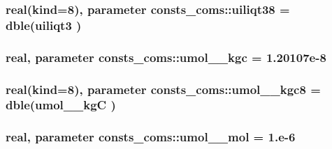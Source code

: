 \subsubsection[{\texorpdfstring{uiliqt38}{uiliqt38}}]{\setlength{\rightskip}{0pt plus 5cm}real(kind=8), parameter consts\+\_\+coms\+::uiliqt38 = dble({\bf uiliqt3} )}\hypertarget{namespaceconsts__coms_a171bd610659557729762f52743c3af83}{}\label{namespaceconsts__coms_a171bd610659557729762f52743c3af83}
\subsubsection[{\texorpdfstring{umol\+\_\+2\+\_\+kgc}{umol_2_kgc}}]{\setlength{\rightskip}{0pt plus 5cm}real, parameter consts\+\_\+coms\+::umol\+\_\+\_\+kgc = 1.\+20107e-\/8}\hypertarget{namespaceconsts__coms_a756eff7bd58f33114bdbf059ce2c6726}{}\label{namespaceconsts__coms_a756eff7bd58f33114bdbf059ce2c6726}
\subsubsection[{\texorpdfstring{umol\+\_\+2\+\_\+kgc8}{umol_2_kgc8}}]{\setlength{\rightskip}{0pt plus 5cm}real(kind=8), parameter consts\+\_\+coms\+::umol\+\_\+\_\+kgc8 = dble(umol\+\_\+\_\+kgC )}\hypertarget{namespaceconsts__coms_a066d6cf149acd92238cbe2e623fcdf1c}{}\label{namespaceconsts__coms_a066d6cf149acd92238cbe2e623fcdf1c}
\subsubsection[{\texorpdfstring{umol\+\_\+2\+\_\+mol}{umol_2_mol}}]{\setlength{\rightskip}{0pt plus 5cm}real, parameter consts\+\_\+coms\+::umol\+\_\+\_\+mol = 1.e-\/6}\hypertarget{namespaceconsts__coms_aba28d1403d413d9d638ca1bf165cdd7a}{}\label{namespaceconsts__coms_aba28d1403d413d9d638ca1bf165cdd7a}
